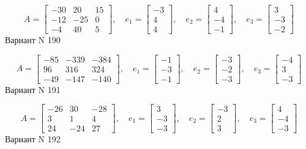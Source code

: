 \documentclass[11pt]{report}
\begin{document}
$$A = \left[\begin{matrix}-30 & 20 & 15\\-12 & -25 & 0\\-4 & 40 & 5\end{matrix}\right],\quad e_1 = \left[\begin{matrix}-3\\4\\4\end{matrix}\right],\quad e_2 = \left[\begin{matrix}4\\-4\\-1\end{matrix}\right],\quad e_3 = \left[\begin{matrix}3\\-3\\-2\end{matrix}\right]$$Вариант N 190

$$A = \left[\begin{matrix}-85 & -339 & -384\\96 & 316 & 324\\-49 & -147 & -140\end{matrix}\right],\quad e_1 = \left[\begin{matrix}-1\\-3\\-1\end{matrix}\right],\quad e_2 = \left[\begin{matrix}-3\\-2\\-3\end{matrix}\right],\quad e_3 = \left[\begin{matrix}-4\\3\\-3\end{matrix}\right]$$Вариант N 191

$$A = \left[\begin{matrix}-26 & 30 & -28\\3 & 1 & 4\\24 & -24 & 27\end{matrix}\right],\quad e_1 = \left[\begin{matrix}3\\-3\\-3\end{matrix}\right],\quad e_2 = \left[\begin{matrix}-3\\2\\3\end{matrix}\right],\quad e_3 = \left[\begin{matrix}4\\-4\\-3\end{matrix}\right]$$Вариант N 192
\end{document}
